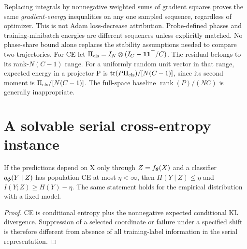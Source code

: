 \begin{remark}
Replacing integrals by nonnegative weighted sums of gradient squares
proves the same \emph{gradient-energy} inequalities on any one sampled
sequence, regardless of optimizer. This is not Adam loss-decrease
attribution. Probe-defined phases and training-minibatch energies are
different sequences unless explicitly matched. No phase-share bound
alone replaces the stability assumptions needed to compare two trajectories.
For CE let $\Pi_{\rm cls}=I_N\otimes(I_C-\boldsymbol1\boldsymbol1^\top/C)$.
The residual belongs to its rank-$N(C-1)$ range. For a uniformly random
unit vector in that range, expected energy in a projector P is
$\operatorname{tr}(P\Pi_{\rm cls})/[N(C-1)]$, since its second moment is
$\Pi_{\rm cls}/[N(C-1)]$. The full-space baseline
$\operatorname{rank}(P)/(NC)$ is generally inappropriate.
\end{remark}

\section{A solvable serial cross-entropy instance}
\label{sec:astra_serial}
\begin{proposition}
\label{prop:astra_information}
If the predictions depend on X only through $Z=f_{\boldsymbol{\theta}}(X)$ and a
classifier $q_{\boldsymbol{\phi}}(Y\mid Z)$ has population CE at most $\eta<\infty$,
then $H(Y\mid Z)\le\eta$ and $I(Y;Z)\ge H(Y)-\eta$.
The same statement holds for the empirical distribution with a fixed model.
\end{proposition}
\begin{proof}
CE is conditional entropy plus the nonnegative expected conditional KL
divergence. Suppression of a selected coordinate or failure under a
specified shift is therefore different from absence of all training-label
information in the serial representation.
\end{proof}

